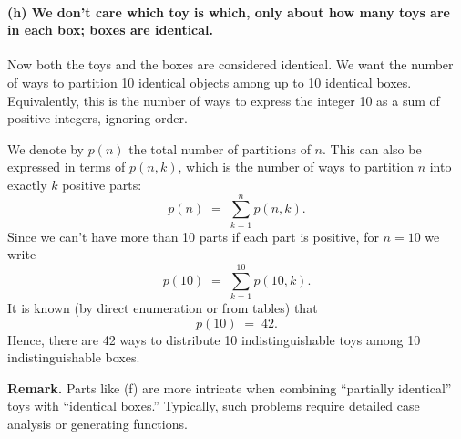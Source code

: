 \documentclass[docmute]{article}
\begin{document}
\paragraph{(h) We don’t care which toy is which, only about how many toys are in each box; boxes are identical.}
Now both the toys and the boxes are considered identical. We want the number of ways to partition 10 identical objects among up to 10 identical boxes. Equivalently, this is the number of ways to express the integer 10 as a sum of positive integers, ignoring order. 

We denote by \(p(n)\) the total number of partitions of \(n\). This can also be expressed in terms of \(p(n,k)\), which is the number of ways to partition \(n\) into exactly \(k\) positive parts:
\[
p(n) \;=\; \sum_{k=1}^{n} p(n,k).
\]
Since we can’t have more than 10 parts if each part is positive, for \(n=10\) we write
\[
p(10) 
\;=\;
\sum_{k=1}^{10} p(10,k).
\]
It is known (by direct enumeration or from tables) that
\[
p(10) \;=\; 42.
\]
Hence, there are 42 ways to distribute 10 indistinguishable toys among 10 indistinguishable boxes.

\bigskip
\noindent
\textbf{Remark.} Parts like (f) are more intricate when combining “partially identical” toys with “identical boxes.” Typically, such problems require detailed case analysis or generating functions.
\end{document}
